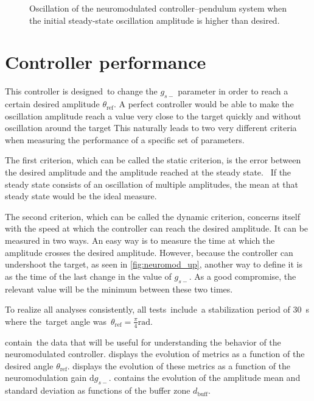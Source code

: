 \begin{figure}[!htbp]
    \centering
    \caption{Oscillation of the neuromodulated controller–pendulum system when the initial steady-state oscillation amplitude is higher than desired.}
    \label{fig:neuromod_down}
\end{figure}

\section{Controller performance}

This controller is designed to change the $g_{s-}$ parameter in order to reach a certain desired amplitude $\theta_\text{ref}$.
A perfect controller would be able to make the oscillation amplitude reach a value very close to the target quickly and without oscillation around the target
This naturally leads to two very different criteria when measuring the performance of a specific set of parameters.

The first criterion, which can be called the static criterion, is the error between the desired amplitude and the amplitude reached at the steady state. 
If the steady state consists of an oscillation of multiple amplitudes, the mean at that steady state would be the ideal measure.

The second criterion, which can be called the dynamic criterion, concerns itself with the speed at which the controller can reach the desired amplitude.
It can be measured in two ways.
An easy way is to measure the time at which the amplitude crosses the desired amplitude.
However, because the controller can undershoot the target, as seen in \cref{fig:neuromod_up}, another way to define it is as the time of the last change in the value of $g_{s-}$.
As a good compromise, the relevant value will be the minimum between these two times.

To realize all analyses consistently, all tests include a stabilization period of \qty{30}{\second} where the target angle was $\theta_\text{ref} = \frac{\pi}{4}\unit{\radian}$.

 contain the data that will be useful for understanding the behavior of the neuromodulated controller.
 displays the evolution of metrics as a function of the desired angle $\theta_\text{ref}$.
 displays the evolution of these metrics as a function of the neuromodulation gain $\mathrm{d}g_{s-}$.
 contains the evolution of the amplitude mean and standard deviation as functions of the buffer zone $d_\text{buff}$.

